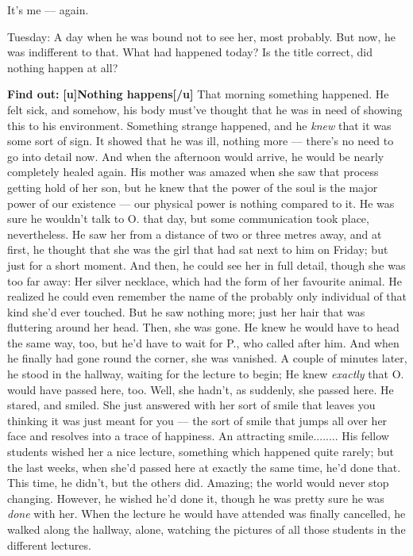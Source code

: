 It's me --- again. 

Tuesday: A day when he was bound not to see her, most probably. 
But now, he was indifferent to that. 
What had happened today?
Is the title correct, did nothing happen at all?

\textbf{Find out:}
\textbf{[u]Nothing happens[/u]}
That morning something happened. 
He felt sick, and somehow, his body must've thought that he was in need of showing this to his environment. Something strange happened, and he \emph{knew} that it was some sort of sign. 
It showed that he was ill, nothing more --- there's no need to go into detail now. 
And when the afternoon would arrive, he would be nearly completely healed again. 
His mother was amazed when she saw that process getting hold of her son, but he knew that the power of the soul is the major power of our existence --- our physical power is nothing compared to it. 
He was sure he wouldn't talk to O. that day, but some communication took place, nevertheless. 
He saw her from a distance of two or three metres away, and at first, he thought that she was the girl that had sat next to him on Friday; but just for a short moment. And then, he could see her in full detail, though she was too far away: Her silver necklace, which had the form of her favourite animal. 
He realized he could even remember the name of the probably only individual of that kind she'd ever touched. 
But he saw nothing more; just her hair that was fluttering around her head. Then, she was gone. He knew he would have to head the same way, too, but he'd have to wait for P., who called after him. And when he finally had gone round the corner, she was vanished. 
A couple of minutes later, he stood in the hallway, waiting for the lecture to begin; He knew \emph{exactly} that O. would have passed here, too. 
Well, she hadn't, as suddenly, she passed here. He stared, and smiled. She just answered with her sort of smile that leaves you thinking it was just meant for you --- the sort of smile that jumps all over her face and resolves into a trace of happiness. 
An attracting smile........
His fellow students wished her a nice lecture, something which happened quite rarely; but the last weeks, when she'd passed here at exactly the same time, he'd done that. 
This time, he didn't, but the others did. 
Amazing; the world would never stop changing. 
However, he wished he'd done it, though he was pretty sure he was \emph{done} with her. 
When the lecture he would have attended was finally cancelled, he walked along the hallway, alone, watching the pictures of all those students in the different lectures. 
